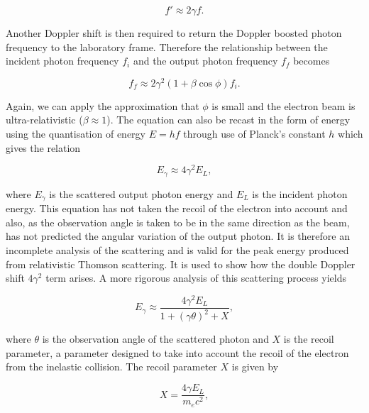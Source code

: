 \documentclass[11pt]{article}
\begin{document}
\begin{equation}
f' \approx 2\gamma f.
\label{eq:dopsimp}
\end{equation}

\noindent Another Doppler shift is then required to return the Doppler boosted photon frequency to the laboratory frame. Therefore the relationship between the incident photon frequency $f_{i}$ and the output photon frequency $f_{f}$ becomes

\begin{equation}
f_{f} \approx 2\gamma^{2}\left(1+\beta\cos\phi\right)f_{i}.
\label{eq:2nddop}
\end{equation}  

\noindent Again, we can apply the approximation that $\phi$ is small and the electron beam is ultra-relativistic ($\beta \approx 1$). The equation can also be recast in the form of energy using the quantisation of energy $E = hf$ through use of Planck's constant $h$ which gives the relation

\begin{equation}
E_{\gamma} \approx 4\gamma^{2} E_{L},
\label{eq:Ethomson}
\end{equation}

\noindent where $E_{\gamma}$ is the scattered output photon energy and $E_{L}$ is the incident photon energy. This equation has not taken the recoil of the electron into account and also, as the observation angle is taken to be in the same direction as the beam, has not predicted the angular variation of the output photon. It is therefore an incomplete analysis of the scattering and is valid for the peak energy produced from relativistic Thomson scattering. It is used to show how the double Doppler shift $4\gamma^{2}$ term arises. A more rigorous analysis of this scattering process yields

\begin{equation}
E_{\gamma} \approx \frac{4\gamma^{2}E_{L}}{1+\left(\gamma\theta\right)^{2}+X},
\label{eq:peaken}
\end{equation}

\noindent where $\theta$ is the observation angle of the scattered photon and $X$ is the recoil parameter, a parameter designed to take into account the recoil of the electron from the inelastic collision. The recoil parameter $X$ is given by

\begin{equation}
X = \frac{4\gamma E_{L}}{m_{e}c^{2}},
\label{eq:recparam}
\end{equation}
\end{document}
